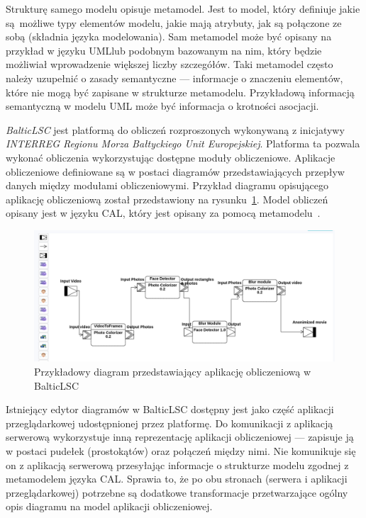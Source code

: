 Strukturę samego modelu opisuje metamodel. Jest to model, który definiuje jakie
są~możliwe typy elementów modelu, jakie mają atrybuty, jak są połączone ze
sobą (składnia języka modelowania). Sam metamodel może być opisany na przykład
w języku UML\@ lub podobnym
bazowanym na nim, który będzie możliwiał wprowadzenie większej liczby
szczegółów. Taki metamodel często należy uzupełnić o zasady semantyczne ---
informacje o znaczeniu elementów, które nie mogą być zapisane w strukturze
metamodelu. Przykładową informacją semantyczną w modelu UML może być informacja
o krotności asocjacji.

\emph{BalticLSC} jest platformą do obliczeń rozproszonych wykonywaną z
inicjatywy
\emph{INTERREG Regionu Morza Bałtyckiego Unit Europejskiej}. Platforma ta
pozwala
wykonać obliczenia wykorzystując dostępne moduły obliczeniowe. Aplikacje
obliczeniowe definiowane są w postaci diagramów przedstawiających przepływ
danych między modułami obliczeniowymi. Przykład diagramu opisującego aplikację
obliczeniową został przedstawiony na
rysunku~\ref{rys:przykladowy-diagram-balticlsc}.  Model obliczeń opisany jest w
języku \gls{CAL}, który jest opisany za pomocą metamodelu~\cite{cal-metamodel}.

\begin{figure}[!hb]
	\centering

	\includegraphics[width=0.95\linewidth]{./images/balticlsc-example-diagram.png}
	\caption{Przykładowy diagram przedstawiający aplikację obliczeniową w
		BalticLSC}\label{rys:przykladowy-diagram-balticlsc}
\end{figure}

Istniejący edytor diagramów w BalticLSC dostępny jest jako część aplikacji
przeglądarkowej udostępnionej przez platformę. Do komunikacji z aplikacją
serwerową wykorzystuje inną reprezentację aplikacji obliczeniowej --- zapisuje
ją w postaci pudełek (prostokątów) oraz połączeń między nimi. Nie komunikuje
się on z aplikacją serwerową przesyłając informacje o strukturze modelu
zgodnej z metamodelem języka \gls{CAL}. Sprawia to, że po obu stronach (serwera
i aplikacji przeglądarkowej) potrzebne są dodatkowe transformacje
przetwarzające ogólny opis diagramu na model aplikacji obliczeniowej.

